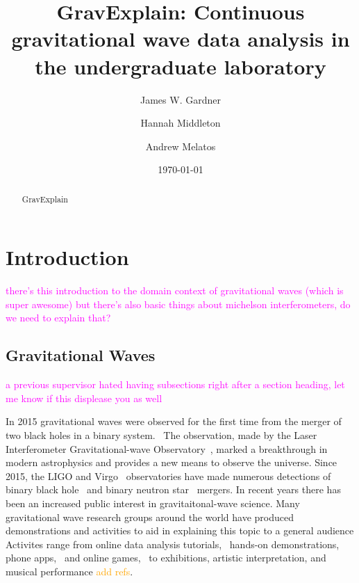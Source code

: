 \documentclass[prb,preprint]{revtex4-1}
\newcommand{\jam}{\textcolor{magenta}}
\newcommand{\han}{\textcolor{orange}}
\begin{document}
\title{GravExplain: Continuous gravitational wave data analysis in the undergraduate laboratory}

\author{James W. Gardner}

\author{Hannah Middleton}
\author{Andrew Melatos}

\date{\today}

\begin{abstract}
GravExplain

\end{abstract}

\maketitle

\section{Introduction}
\jam{there’s this introduction to the domain context of gravitational waves (which is super awesome) but there’s also basic things about michelson interferometers, do we need to explain that?}

\subsection{Gravitational Waves}
\jam{a previous supervisor hated having subsections right after a section heading, let me know if this displease you as well}

In 2015 gravitational waves were observed for the first time from the merger of two black holes in a binary system.~\cite{GW150914} 
The observation, made by the Laser Interferometer Gravitational-wave Observatory~\citep[LIGO]{AdvancedLIGO:2015}, marked a breakthrough in modern astrophysics and provides a new means to observe the universe. 
Since 2015, the LIGO and Virgo~\cite{AdvancedVirgo:2015} observatories have made numerous detections of binary black hole~\cite{GW151226,GW170104,GW170814} and binary neutron star~\cite{GW170817,GW170817multi,GW190425} mergers. 
In recent years there has been an increased public interest in gravitaitonal-wave science. 
Many gravitational wave research groups around the world have produced demonstrations and activities to aid in explaining this topic to a general audience
Activites range from online data analysis tutorials,~\cite{GWOSC:online,LOSC:2015} hands-on demonstrations, phone apps,~\cite{LaserLabs:online,SciVR:online} and online games,~\cite{BlackHoleHunter:online} to exhibitions,\cite{L2URSSE} artistic interpretation, and musical performance \han{add refs}. 
\end{document}
